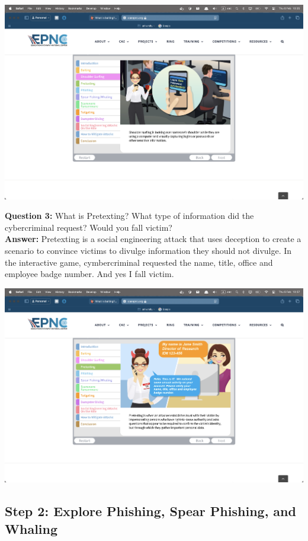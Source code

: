 \documentclass{article}
\begin{document}
\includegraphics[width=1\textwidth]{2.png}

\newpage

\textbf{Question 3: } What is Pretexting? What type of information did the cybercriminal request? Would you fall victim? \\
\textbf{Answer: } Pretexting is a social engineering attack that uses deception to create a scenario to convince victims to divulge information they should not divulge. In the interactive game, cymbercriminal requested the name, title, office and employee badge number. And yes I fall victim. \\

\vspace{1\baselineskip}

\includegraphics[width=1\textwidth]{3.png}

\newpage

\subsection*{Step 2: Explore Phishing, Spear Phishing, and Whaling}
\end{document}
